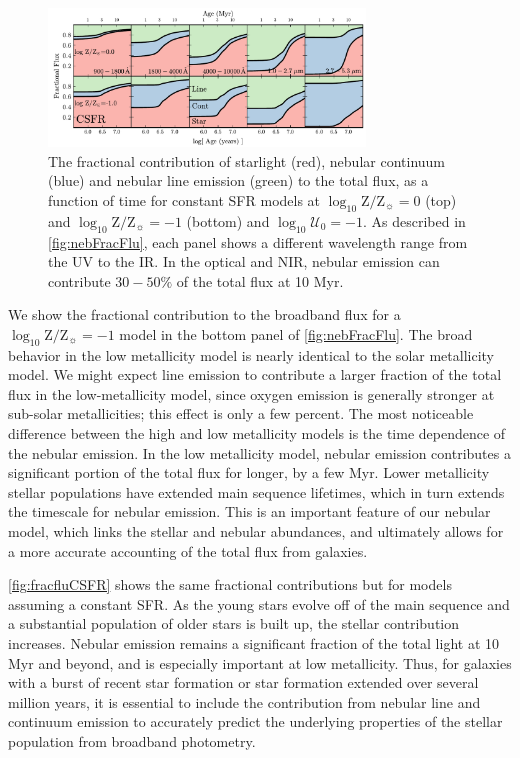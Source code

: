 \documentclass[linenumbers, tighten, trackchanges]{aastex61}%
\newcommand{\Fig}[1]{\autoref{fig:#1}}
\newcommand{\logten}{\ensuremath{\log_{10}}}
\newcommand{\logZeq}[1]{\ensuremath{\logten \mathrm{Z}/\mathrm{Z}_{\sun} = #1}}
\newcommand{\logU}{\ensuremath{\logten \mathcal{U}_0}}
\begin{document}
\begin{figure}[!htbp]
  \begin{centering}
    \includegraphics[width=0.75\textwidth]{f13.pdf}
    \caption{The fractional contribution of starlight (red), nebular continuum (blue) and nebular line emission (green) to the total flux, as a function of time for constant SFR models at \logZeq{0} (top) and \logZeq{-1} (bottom) and $\logU=-1$. As described in \Fig{nebFracFlu}, each panel shows a different wavelength range from the UV to the IR. In the optical and NIR, nebular emission can contribute $30-50\%$ of the total flux at 10 Myr.}
    \label{fig:fracfluCSFR}
  \end{centering}
\end{figure}
We show the fractional contribution to the broadband flux for a \logZeq{-1} model in the bottom panel of \Fig{nebFracFlu}. The broad behavior in the low metallicity model is nearly identical to the solar metallicity model. We might expect line emission to contribute a larger fraction of the total flux in the low-metallicity model, since oxygen emission is generally stronger at sub-solar metallicities; this effect is only a few percent. The most noticeable difference between the high and low metallicity models is the time dependence of the nebular emission. In the low metallicity model, nebular emission contributes a significant portion of the total flux for longer, by a few Myr. Lower metallicity stellar populations have extended main sequence lifetimes, which in turn extends the timescale for nebular emission. This is an important feature of our nebular model, which links the stellar and nebular abundances, and ultimately allows for a more accurate accounting of the total flux from galaxies.

\Fig{fracfluCSFR} shows the same fractional contributions but for models assuming a constant SFR. As the young stars evolve off of the main sequence and a substantial population of older stars is built up, the stellar contribution increases. Nebular emission remains a significant fraction of the total light at 10 Myr and beyond, and is especially important at low metallicity. Thus, for galaxies with a burst of recent star formation or star formation extended over several million years, it is essential to include the contribution from nebular line and continuum emission to accurately predict the underlying properties of the stellar population from broadband photometry.
\end{document}
